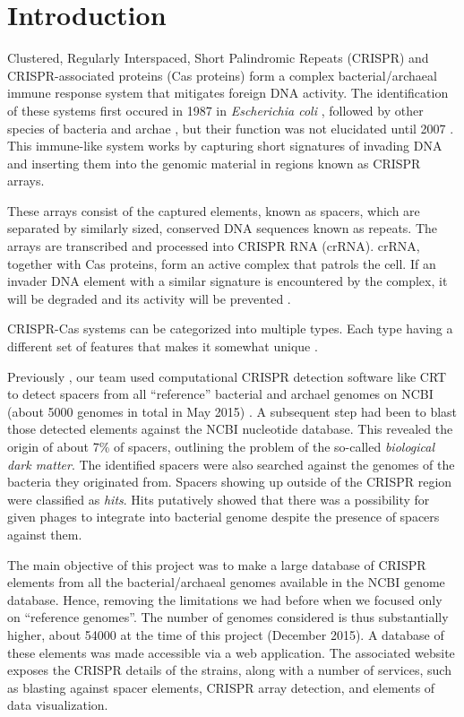 \documentclass[11pt, a4paper,titlepage]{article}
\begin{document}


\section{Introduction}

Clustered, Regularly Interspaced, Short Palindromic Repeats (CRISPR)
and CRISPR-associated proteins (Cas proteins) form a complex
bacterial/archaeal immune response system that mitigates foreign DNA
activity. The identification of these systems first occured in 1987 in
\emph{Escherichia coli} \cite{nakata1989unusual}, followed by other
species of bacteria and archae \cite{mojica1995long}, but their
function was not elucidated until 2007 \cite{Barrangou23032007}. This
immune-like system works by capturing short signatures of invading DNA
and inserting them into the genomic material in regions known as
CRISPR arrays.

These arrays consist of the captured elements, known as spacers, which
are separated by similarly sized, conserved DNA sequences known as
repeats.  The arrays are transcribed and processed into CRISPR RNA
(crRNA). crRNA, together with Cas proteins, form an active complex
that patrols the cell. If an invader DNA element with a similar
signature is encountered by the complex, it will be degraded and its
activity will be prevented \cite{Horvath08012010}.

CRISPR-Cas systems can be categorized into multiple types. Each type
having a different set of features that makes it somewhat unique
\cite{makarova2011evolution}.

Previously \cite{Omicians2015}, our team used computational CRISPR
detection software like CRT \cite{bland2007crispr} to detect spacers
from all ``reference'' bacterial and archael genomes on NCBI (about
5000 genomes in total in May 2015) . A subsequent step had been to
blast those detected elements against the NCBI nucleotide
database. This revealed the origin of about 7\% of spacers, outlining
the problem of the so-called \emph{biological dark matter}. The
identified spacers were also searched against the genomes of the
bacteria they originated from. Spacers showing up outside of the
CRISPR region were classified as \emph{hits}. Hits putatively showed
that there was a possibility for given phages to integrate into
bacterial genome despite the presence of spacers against them.

The main objective of this project was to make a large database of
CRISPR elements from all the bacterial/archaeal genomes available in
the NCBI genome database. Hence, removing the limitations we had
before when we focused only on ``reference genomes''. The number of
genomes considered is thus substantially higher, about 54000 at the
time of this project (December 2015). A database of these elements was
made accessible via a web application. The associated website exposes
the CRISPR details of the strains, along with a number of services,
such as blasting against spacer elements, CRISPR array detection, and
elements of data visualization.
\end{document}
